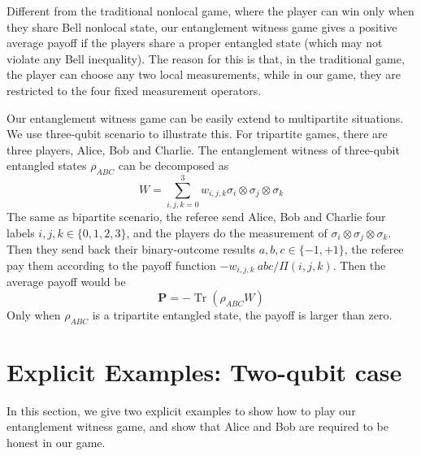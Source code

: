 \documentclass[twocolumn,pra,showpacs,superscriptaddress]{revtex4-1}
\DeclareMathOperator{\Tr}{Tr}
\begin{document}
Different from the traditional nonlocal game, where the player can win
only when they share Bell nonlocal state, our entanglement witness game gives a
positive average payoff if the players share a proper entangled state
(which may not violate any Bell inequality). The reason for this is
that, in the traditional game, the player can choose any two local
measurements, while in our game, they are restricted to the four fixed
measurement operators.

Our entanglement witness game can be easily extend to multipartite situations. We
use three-qubit scenario to illustrate this. For tripartite games,
there are three players, Alice, Bob and Charlie. The entanglement
witness of three-qubit entangled states $\rho_{ABC}$ can be decomposed
as
\begin{equation}
  W=\sum_{i,j,k=0}^3w_{i,j,k}\sigma_i\otimes\sigma_j\otimes\sigma_k
\end{equation}
The same as bipartite scenario, the referee send Alice, Bob and
Charlie four labels $i,j,k\in\{0,1,2,3\}$, and the players do the
measurement of $\sigma_{i}\otimes\sigma_{j}\otimes\sigma_{k}$. Then
they send back their binary-outcome results
$a,b,c\in\{-1,+1\}$, the referee pay them according to the
payoff function $-w_{i,j,k}~abc/\Pi(i,j,k)$. Then the average payoff
would be
\begin{equation}
  \textbf{P}=-\Tr(\rho_{ABC}W)
\end{equation}
Only when $\rho_{ABC}$ is a tripartite entangled state, the payoff
is larger than zero.



\section{Explicit Examples: Two-qubit case}

In this section, we give two explicit examples to show how to play our entanglement witness game,
and show that Alice and Bob are required to be honest in our game.
\end{document}
